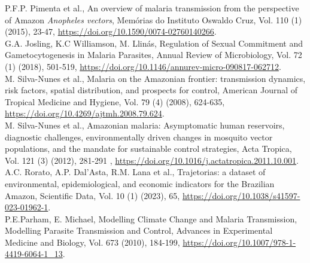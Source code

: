 \documentclass[3p,times]{elsarticle}
\begin{document}
\newpage
 \begin{thebibliography}{00}


 P.F.P. Pimenta et al., An overview of malaria transmission from the perspective of Amazon \emph{Anopheles vectors}, Memórias do Instituto Oswaldo Cruz, Vol. 110 (1) (2015), 23-47, \href{https://doi.org/10.1590/0074-02760140266}{https://doi.org/10.1590/0074-02760140266}.
\\
 G.A. Josling, K.C Williamson, M. Llinás, Regulation of Sexual Commitment and Gametocytogenesis in Malaria Parasites, Annual Review of Microbiology, Vol. 72 (1) (2018), 501-519, \href{https://doi.org/10.1146/annurev-micro-090817-062712}{https://doi.org/10.1146/annurev-micro-090817-062712}.
\\
 M. Silva-Nunes et al., Malaria on the Amazonian frontier: transmission dynamics, risk factors, spatial distribution, and prospects for control, American Journal of Tropical Medicine and Hygiene, Vol. 79 (4) (2008), 624-635, \href{https://doi.org/10.4269/ajtmh.2008.79.624}{https://doi.org/10.4269/ajtmh.2008.79.624}. 
\\
 M. Silva-Nunes et al.,  Amazonian malaria: Asymptomatic human reservoirs, diagnostic challenges, environmentally driven changes in mosquito vector populations, and the mandate for sustainable control strategies, Acta Tropica, Vol. 121 (3) (2012), 281-291 , \href{https://doi.org/10.1016/j.actatropica.2011.10.001}{https://doi.org/10.1016/j.actatropica.2011.10.001}.
\\
 A.C. Rorato, A.P. Dal’Asta, R.M. Lana et al., Trajetorias: a dataset of environmental, epidemiological, and economic indicators for the Brazilian Amazon, Scientific Data, Vol. 10 (1) (2023), 65, \href{https://doi.org/10.1038/s41597-023-01962-1}{https://doi.org/10.1038/s41597-023-01962-1}.
\\
 P.E.Parham, E. Michael, Modelling Climate Change and Malaria Transmission, Modelling Parasite Transmission and Control, Advances in Experimental Medicine and Biology, Vol. 673 (2010), 184-199, \href{https://doi.org/10.1007/978-1-4419-6064-1_13}{https://doi.org/10.1007/978-1-4419-6064-1\_13}.

\end{thebibliography}
\end{document}
